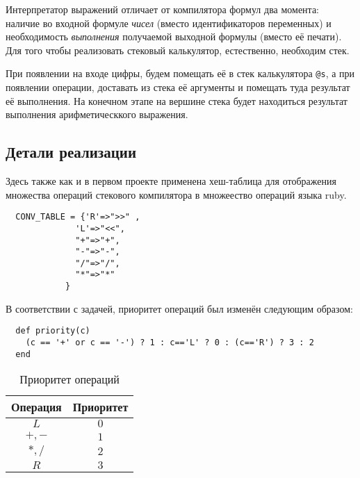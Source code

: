 Интерпретатор выражений отличает от компилятора формул два момента: наличие во
входной формуле \emph{чисел} (вместо идентификаторов переменных) и необходимость
\emph{выполнения} получаемой выходной формулы (вместо её печати). Для того чтобы
реализовать стековый калькулятор, естественно, необходим стек.

При появлении на входе цифры, будем помещать её в стек калькулятора \verb|@s|,
а при появлении операции, доставать из стека её аргументы и помещать туда результат
её выполнения. На конечном этапе на вершине стека будет находиться результат
выполнения арифметическкого выражения.

\subsection{Детали реализации}
Здесь также как и в первом проекте применена хеш-таблица для отображения множества
операций стекового компилятора в множеество операций языка ruby.
\begin{lstlisting}
  CONV_TABLE = {'R'=>">>" ,
              'L'=>"<<",
              "+"=>"+",
              "-"=>"-",
              "/"=>"/",
              "*"=>"*"
            }
\end{lstlisting}
В соответствии с задачей, приоритет операций был изменён следующим образом:
\begin{lstlisting}
  def priority(c)
    (c == '+' or c == '-') ? 1 : c=='L' ? 0 : (c=='R') ? 3 : 2
  end
\end{lstlisting}

\begin{table}[ht!]
\caption{Приоритет операций}
\begin{center}
\begin{tabular}{cc}
\hline
Операция&Приоритет\\
\hline
$L$&$0$\\
$+,-$&$1$\\
$*,/$&$2$\\
$R$&$3$\\
\hline
\end{tabular}
\end{center}
\end{table}
